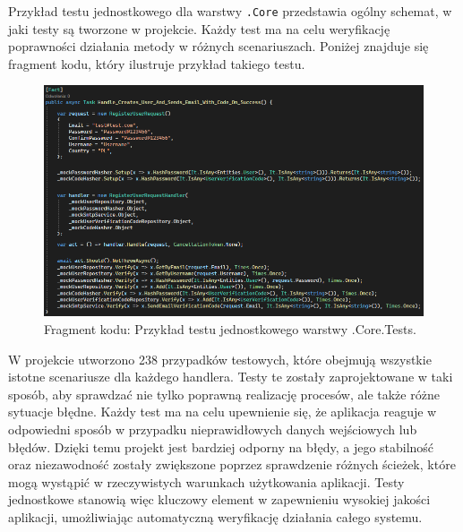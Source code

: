 \documentclass[12pt,a4paper]{article}
\begin{document}
\newpage

\noindent
Przykład testu jednostkowego dla warstwy \texttt{.Core} przedstawia ogólny schemat, w jaki testy są tworzone w projekcie. Każdy test ma na celu weryfikację poprawności działania metody w różnych scenariuszach. Poniżej znajduje się fragment kodu, który ilustruje przykład takiego testu.

\vspace{0.5cm}
\begin{figure}[h!]
    \centering
    \includegraphics[width=1\textwidth]{images/ex_core_test.png}
    \caption{Fragment kodu: Przykład testu jednostkowego warstwy .Core.Tests.}
\end{figure}
\vspace{0.5cm}

W projekcie utworzono 238 przypadków testowych, które obejmują wszystkie istotne scenariusze dla każdego handlera. Testy te zostały zaprojektowane w taki sposób, aby sprawdzać nie tylko poprawną realizację procesów, ale także różne sytuacje błędne. Każdy test ma na celu upewnienie się, że aplikacja reaguje w odpowiedni sposób w przypadku nieprawidłowych danych wejściowych lub błędów. Dzięki temu projekt jest bardziej odporny na błędy, a jego stabilność oraz niezawodność zostały zwiększone poprzez sprawdzenie różnych ścieżek, które mogą wystąpić w rzeczywistych warunkach użytkowania aplikacji. Testy jednostkowe stanowią więc kluczowy element w zapewnieniu wysokiej jakości aplikacji, umożliwiając automatyczną weryfikację działania całego systemu.

\newpage
\end{document}
